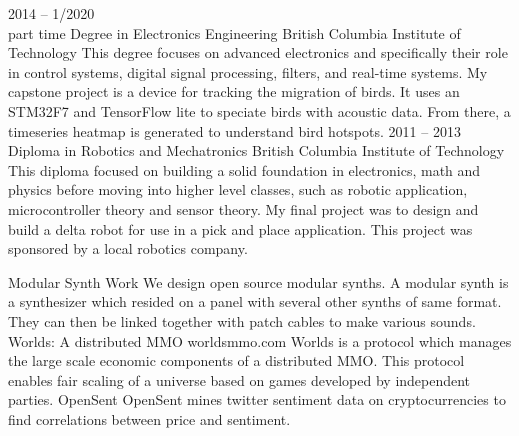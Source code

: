 \documentclass[9pt]{developercv} %
\begin{document}


\begin{entrylist}
	\entry
		{2014 -- 1/2020\\ \footnotesize{part time}}
		{Degree in Electronics Engineering}
		{British Columbia Institute of Technology}
		{This degree focuses on advanced electronics and specifically their role in control systems, digital signal processing, filters, and real-time systems. My capstone project is a device for tracking the migration of birds. It uses an STM32F7 and TensorFlow lite to speciate birds with acoustic data. From there, a timeseries heatmap is generated to understand bird hotspots.}
	\entry
		{2011 -- 2013}
		{Diploma in Robotics and Mechatronics}
		{British Columbia Institute of Technology}
		{This diploma focused on building a solid foundation in electronics, math and physics before moving into higher level classes, such as robotic application, microcontroller theory and sensor theory. My final project was to design and build a delta robot for use in a pick and place application. This project was sponsored by a local robotics company.}
\end{entrylist}



\begin{entrylist}
	\entry
		{}
		{Modular Synth Work}
		{}
		{We design open source modular synths. A modular synth is a synthesizer which resided on a panel with several other synths of same format. They can then be linked together with patch cables to make various sounds.}
	\entry
		{}
		{Worlds: A distributed MMO}
		{worldsmmo.com}
		{Worlds is a protocol which manages the large scale economic components of a distributed MMO. This protocol enables fair scaling of a universe based on games developed by independent parties.}
  \entry
		{}
		{OpenSent}
		{}
		{OpenSent mines twitter sentiment data on cryptocurrencies to find correlations between price and sentiment.}

\end{entrylist}
\end{document}
